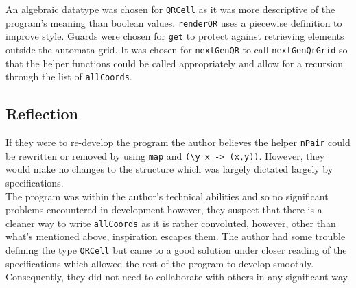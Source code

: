 \documentclass[11pt]{article}
\begin{document}
   An algebraic datatype was chosen for \verb|QRCell| as it was more descriptive of the program's meaning than boolean values. \verb|renderQR| uses a piecewise definition to improve style. Guards were chosen for \verb|get| to protect against retrieving elements outside the automata grid.  It was chosen for \verb|nextGenQR| to call \verb|nextGenQrGrid| so that the helper functions could be called appropriately and allow for a recursion through the list of \verb|allCoords|.

   \subsection{Reflection}
   If they were to re-develop the program the author believes the helper  \verb|nPair| could be rewritten or removed by using \verb|map| and \verb|(\y x -> (x,y))|. However, they would make no changes to the structure which was largely dictated largely by specifications.\\
   
   The program was within the author's technical abilities and so no significant problems encountered in development however, they suspect that there is a cleaner way to write \verb|allCoords| as it is rather convoluted, however, other than what's mentioned above, inspiration escapes them. The author had some trouble defining the type \verb|QRCell| but came to a good solution under closer reading of the specifications which allowed the rest of the program to develop smoothly. Consequently, they did not need to collaborate with others in any significant way.






\end{document}
